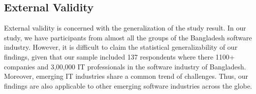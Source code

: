 \subsection{External Validity}
External validity is concerned with the generalization of the study result. In our study, we have participants from almost all the groups of the Bangladesh software industry. However, it is difficult to claim the statistical generalizability of our findings, given that our sample included 137 respondents where there 1100+ companies and 3,00,000 IT professionals\citep{BASIS2018} in the software industry of Bangladesh. Moreover, emerging IT industries share a common trend of challenges\citep{Sison2006, lloyd2020}. Thus, our findings are also applicable to other emerging software industries across the globe.